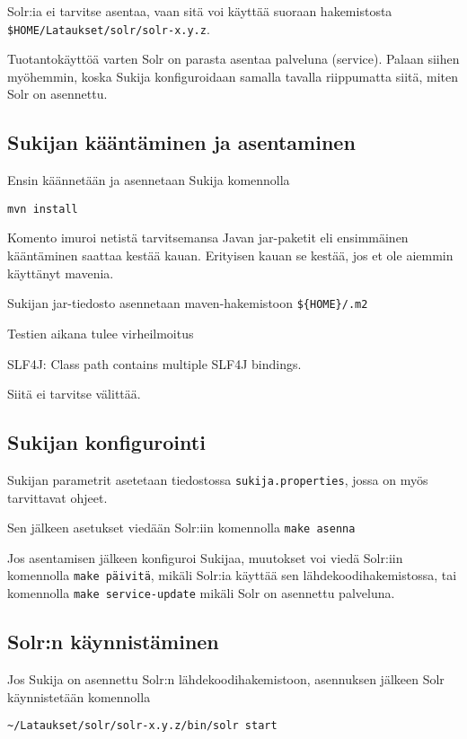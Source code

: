 \documentclass[12pt]{article}
\begin{document}
Solr:ia ei tarvitse asentaa, vaan sitä voi käyttää suoraan
hakemistosta \verb=$HOME/Lataukset/solr/solr-x.y.z=.

Tuotantokäyttöä varten Solr on parasta asentaa palveluna (service).
Palaan siihen myöhemmin, koska Sukija konfiguroidaan samalla tavalla
riippumatta siitä, miten Solr on asennettu.



\subsection*{Sukijan kääntäminen ja asentaminen}

Ensin käännetään ja asennetaan Sukija komennolla

\verb=mvn install=

Komento imuroi netistä tarvitsemansa Javan jar-paketit eli ensimmäinen
kääntäminen saattaa kestää kauan. Erityisen kauan se kestää, jos et
ole aiemmin käyttänyt mavenia.

Sukijan jar-tiedosto asennetaan maven-hakemistoon \verb|${HOME}/.m2|

Testien aikana tulee virheilmoitus

SLF4J: Class path contains multiple SLF4J bindings.

Siitä ei tarvitse välittää.


\subsection*{Sukijan konfigurointi}


Sukijan parametrit asetetaan tiedostossa \verb|sukija.properties|,
jossa on myös tarvittavat ohjeet.

Sen jälkeen asetukset viedään Solr:iin komennolla \verb|make asenna|

Jos asentamisen jälkeen konfiguroi Sukijaa, muutokset voi viedä
Solr:iin komennolla \verb|make päivitä|, mikäli Solr:ia käyttää sen
lähdekoodihakemistossa, tai komennolla \verb|make service-update|
mikäli Solr on asennettu palveluna.


\subsection*{Solr:n käynnistäminen}

Jos Sukija on asennettu Solr:n lähdekoodihakemistoon,
asennuksen jälkeen Solr käynnistetään komennolla

\verb|~/Lataukset/solr/solr-x.y.z/bin/solr start|
\end{document}
